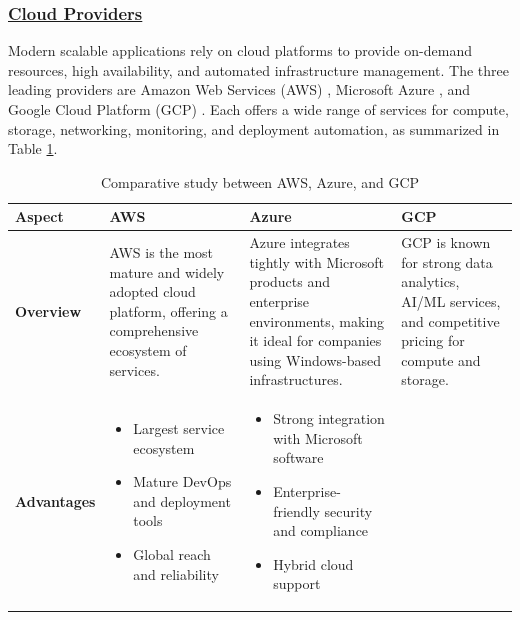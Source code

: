 \subsubsection*{\underline{Cloud Providers}}
Modern scalable applications rely on cloud platforms to provide on-demand
resources, high availability, and automated infrastructure management. The
three leading providers are Amazon Web Services (AWS) \cite{aws}, Microsoft Azure \cite{azure},
and Google Cloud Platform (GCP) \cite{gcp}. Each offers a wide range of services for
compute, storage, networking, monitoring, and deployment automation, as summarized 
in Table \ref{tab:cloud_providers}.

\begin{table}[H]
    \renewcommand{\arraystretch}{1.5}%
    \caption{Comparative study between AWS, Azure, and GCP}
    \label{tab:cloud_providers}
    \centering
    \medskip
    \begin{tabularx}{\textwidth} {
            | >{\centering\arraybackslash}p{2cm}
            | >{\justifying\arraybackslash}X
            | >{\justifying\arraybackslash}X
            | >{\justifying\arraybackslash}X |}
        \hline
        \rowcolor{primary} \textbf{Aspect} & \textbf{AWS} & \textbf{Azure} & \textbf{GCP} \\
        \hline
        \textbf{Overview} & AWS is the most mature and widely adopted cloud platform, offering a comprehensive ecosystem of services. & Azure integrates tightly with Microsoft products and enterprise environments, making it ideal for companies using Windows-based infrastructures. & GCP is known for strong data analytics, AI/ML services, and competitive pricing for compute and storage. \\
        \hline
        \textbf{Advantages} & \begin{itemize}[leftmargin=*, topsep=0pt, itemsep=1pt, parsep=2pt]
            \item Largest service ecosystem
            \item Mature DevOps and deployment tools
            \item Global reach and reliability
        \end{itemize} & \begin{itemize}[leftmargin=*, topsep=0pt, itemsep=1pt, parsep=2pt]
            \item Strong integration with Microsoft software
            \item Enterprise-friendly security and compliance
            \item Hybrid cloud support

\end{itemize}
\end{tabularx}
\end{table}
